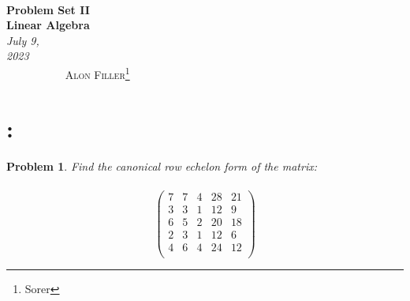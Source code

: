 \documentclass[12pt]{article}
\renewcommand{\=}[1]{\stackrel{#1}{=}} %
\newtheorem{p}{Problem}[section]
\theoremstyle{definition}
\begin{document}
{\noindent\Huge\bf  \\[0.5\baselineskip] {\selectfont  Problem Set II}         }\\[2\baselineskip] %
{ {\bf {}\selectfont Linear Algebra}\\ {\textit{\selectfont     July 9, 2023}}}~~~~~~~~~~~~~~~~~~~~~~~~~~~~~~~~~~~~~~~~~~~~~~~~~~~~~~~~~~~~~~~~~~~~~~~~~~~~~    {\large \textsc{Alon Filler}\footnote{Sorer}} %
\\[1.4\baselineskip] 
\section{:}
\begin{p}
  \emph{Find the canonical row echelon form of the matrix:} \\
  \\
  \[
  \begin{pmatrix}
    7 & 7 & 4 & 28 & 21 \\
    3 & 3 & 1 & 12 & 9  \\
    6 & 5 & 2 & 20 & 18 \\
    2 & 3 & 1 & 12 & 6  \\
    4 & 6 & 4 & 24 & 12 \\
  \end{pmatrix}
  \]
\end{p}
\end{document}
